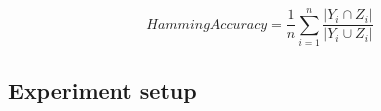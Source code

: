 \documentclass[wcp]{jmlr}
\begin{document}
\begin{equation}\label{eq:hamming}
HammingAccuracy=\frac{1}{n} \sum_{i=1}^n \frac{\left|Y_i \cap Z_i\right|}{\left|Y_i \cup Z_i\right|}
\end{equation}



\subsection{Experiment setup}\label{sec:expSetup}
\end{document}
